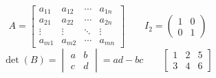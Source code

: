 \documentclass{article}
\begin{document}
\[
  A = \begin{bmatrix}
        a_{11} & a_{12} & \cdots & a_{1n} \\
        a_{21} & a_{22} & \cdots & a_{2n} \\
        \vdots & \vdots & \ddots & \vdots \\
        a_{m1} & a_{m2} & \cdots & a_{mn}
      \end{bmatrix}
  \qquad
  I_2 = \begin{pmatrix} 1 & 0 \\ 0 & 1 \end{pmatrix}
\]
\[
  \det(B) = \begin{vmatrix} a & b \\ c & d \end{vmatrix} = ad - bc
  \qquad
  \left[\begin{array}{cc|c}
    1 & 2 & 5 \\
    3 & 4 & 6
  \end{array}\right]
\]
\end{document}
